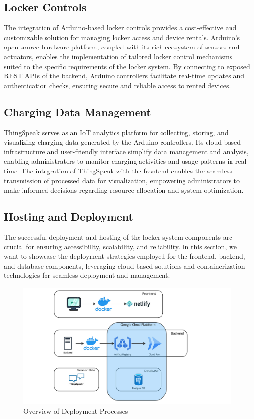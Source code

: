 \subsection{Locker Controls}
The integration of Arduino-based locker controls provides a cost-effective and customizable solution for managing locker access and device rentals. Arduino's open-source hardware platform, coupled with its rich ecosystem of sensors and actuators, enables the implementation of tailored locker control mechanisms suited to the specific requirements of the locker system. By connecting to exposed REST APIs of the backend, Arduino controllers facilitate real-time updates and authentication checks, ensuring secure and reliable access to rented devices.

\subsection{Charging Data Management}
ThingSpeak serves as an IoT analytics platform for collecting, storing, and visualizing charging data generated by the Arduino controllers. Its cloud-based infrastructure and user-friendly interface simplify data management and analysis, enabling administrators to monitor charging activities and usage patterns in real-time. The integration of ThingSpeak with the frontend enables the seamless transmission of processed data for visualization, empowering administrators to make informed decisions regarding resource allocation and system optimization.

\subsection{Hosting and Deployment}
The successful deployment and hosting of the locker system components are crucial for ensuring accessibility, scalability, and reliability. In this section, we want to showcase the deployment strategies employed for the frontend, backend, and database components, leveraging cloud-based solutions and containerization technologies for seamless deployment and management.

\begin{figure}[h]
    \centering
    \includegraphics[width=\textwidth]{images/software_design_deployment}
    \caption{Overview of Deployment Processes}
    \label{fig:deployment_overview}
\end{figure}

